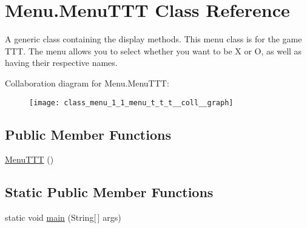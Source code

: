 \hypertarget{class_menu_1_1_menu_t_t_t}{}\section{Menu.\+Menu\+T\+T\+T Class Reference}
\label{class_menu_1_1_menu_t_t_t}


A generic class containing the display methods. This menu class is for the game T\+T\+T. The menu allows you to select whether you want to be X or O, as well as having their respective names.  




Collaboration diagram for Menu.\+Menu\+T\+T\+T\+:\nopagebreak
\begin{figure}[H]
\begin{center}
\leavevmode
\texttt{[image: class\_menu\_1\_1\_menu\_t\_t\_t\_\_coll\_\_graph]}
\end{center}
\end{figure}
\subsection*{Public Member Functions}
\begin{DoxyCompactItemize}
\item 
\hyperlink{class_menu_1_1_menu_t_t_t_ad4e37e7c616519cc089666adf3bda2ad}{Menu\+T\+T\+T} ()
\end{DoxyCompactItemize}
\subsection*{Static Public Member Functions}
\begin{DoxyCompactItemize}
\item 
static void \hyperlink{class_menu_1_1_menu_t_t_t_aadb5ca51346ce541623408f04e806ba3}{main} (String\mbox{[}$\,$\mbox{]} args)
\end{DoxyCompactItemize}
